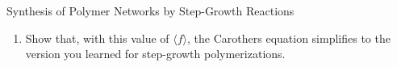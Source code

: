 \begin{activity}[extension]{Synthesis of Polymer Networks by Step-Growth Reactions}
\begin{exercises}
\begin{enumerate}
			\item Show that, with this value of $\langle f\rangle$, the Carothers equation simplifies to the version you learned for step-growth polymerizations.
			
				\begin{solution}\end{solution}
		\end{enumerate}	
	
\end{exercises}


%
%	


	
\end{activity}